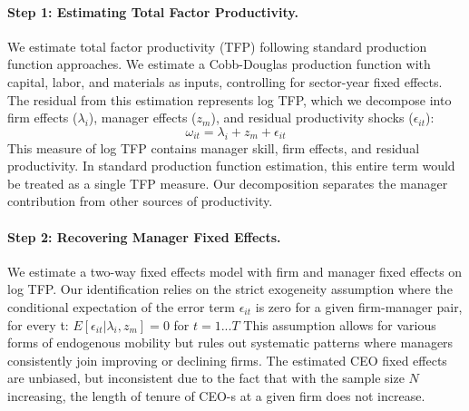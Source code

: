 \documentclass[11pt,a4paper]{article}
\begin{document}
\paragraph{Step 1: Estimating Total Factor Productivity.} We estimate total factor productivity (TFP) following standard production function approaches. We estimate a Cobb-Douglas production function with capital, labor, and materials as inputs, controlling for sector-year fixed effects. The residual from this estimation represents log TFP, which we decompose into firm effects ($\lambda_i$), manager effects ($z_m$), and residual productivity shocks ($\epsilon_{it}$):
\begin{equation}
\omega_{it} = \lambda_i + z_m + \epsilon_{it}
\end{equation}
This measure of log TFP contains manager skill, firm effects, and residual productivity. In standard production function estimation, this entire term would be treated as a single TFP measure. Our decomposition separates the manager contribution from other sources of productivity.

\paragraph{Step 2: Recovering Manager Fixed Effects.}

We estimate a two-way fixed effects model with firm and manager fixed effects on log TFP. Our identification relies on the strict exogeneity assumption where the conditional expectation of the error term $\epsilon_{it}$ is zero for a given firm-manager pair, for every t: $E[\epsilon_{it}|\lambda_i, z_m]=0$ for $t=1...T$ This assumption allows for various forms of endogenous mobility but rules out systematic patterns where managers consistently join improving or declining firms. The estimated CEO fixed effects are unbiased, but inconsistent due to the fact that with the sample size $N$ increasing, the length of tenure of CEO-s at a given firm does not increase.
\end{document}
